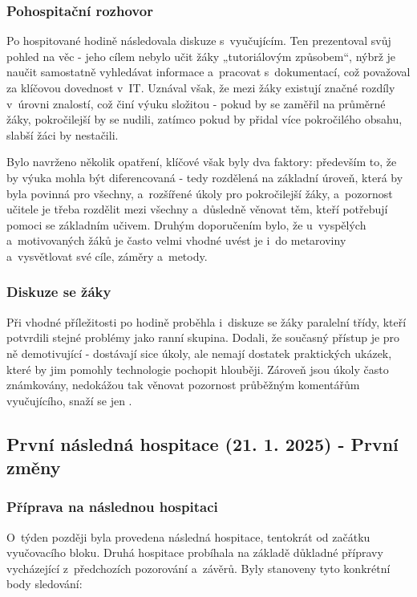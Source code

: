 \subsubsection*{Pohospitační rozhovor}

Po hospitované hodině následovala diskuze s~vyučujícím. Ten prezentoval svůj pohled na věc - jeho cílem nebylo učit žáky „tutoriálovým způsobem“, nýbrž je naučit samostatně vyhledávat informace a~pracovat s~dokumentací, což považoval za klíčovou dovednost v~IT. Uznával však, že mezi žáky existují značné rozdíly v~úrovni znalostí, což činí výuku složitou - pokud by se zaměřil na průměrné žáky, pokročilejší by se nudili, zatímco pokud by přidal více pokročilého obsahu, slabší žáci by nestačili.

Bylo navrženo několik opatření, klíčové však byly dva faktory: především to, že by výuka mohla být diferencovaná - tedy rozdělená na základní úroveň, která by byla povinná pro všechny, a~rozšířené úkoly pro pokročilejší žáky, a~pozornost učitele je třeba rozdělit mezi všechny a~důsledně věnovat těm, kteří potřebují pomoci se základním učivem. Druhým doporučením bylo, že u~vyspělých a~motivovaných žáků je často velmi vhodné uvést je i~do metaroviny a~vysvětlovat své cíle, záměry a~metody.

\subsubsection*{Diskuze se žáky}
Při vhodné příležitosti po hodině proběhla i~diskuze se žáky paralelní třídy, kteří potvrdili stejné problémy jako ranní skupina. Dodali, že současný přístup je pro ně demotivující - dostávají sice úkoly, ale nemají dostatek praktických ukázek, které by jim pomohly technologie pochopit hlouběji. Zároveň jsou úkoly často známkovány, nedokážou tak věnovat pozornost průběžným komentářům vyučujícího, snaží se jen .


\subsection{První následná hospitace (21. 1. 2025) - První změny}

\subsubsection*{Příprava na následnou hospitaci}

O~týden později byla provedena následná hospitace, tentokrát od začátku vyučovacího bloku. Druhá hospitace probíhala na základě důkladné přípravy vycházející z~předchozích pozorování a~závěrů. Byly stanoveny tyto konkrétní body sledování:

